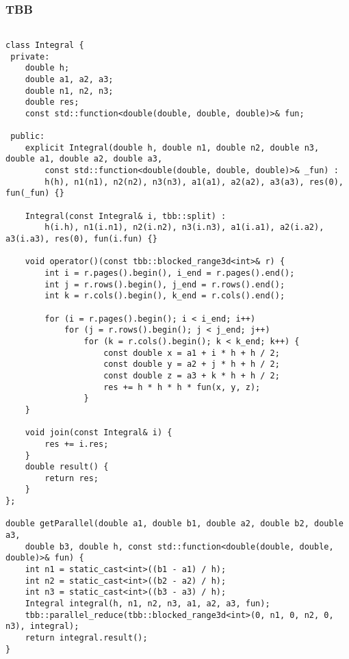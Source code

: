 \documentclass[14pt, a4paper]{extarticle}
\begin{document}
    \subsubsection{TBB}
  \begin{lstlisting}

class Integral {
 private:
    double h;
    double a1, a2, a3;
    double n1, n2, n3;
    double res;
    const std::function<double(double, double, double)>& fun;

 public:
    explicit Integral(double h, double n1, double n2, double n3, double a1, double a2, double a3,
        const std::function<double(double, double, double)>& _fun) :
        h(h), n1(n1), n2(n2), n3(n3), a1(a1), a2(a2), a3(a3), res(0), fun(_fun) {}

    Integral(const Integral& i, tbb::split) :
        h(i.h), n1(i.n1), n2(i.n2), n3(i.n3), a1(i.a1), a2(i.a2), a3(i.a3), res(0), fun(i.fun) {}

    void operator()(const tbb::blocked_range3d<int>& r) {
        int i = r.pages().begin(), i_end = r.pages().end();
        int j = r.rows().begin(), j_end = r.rows().end();
        int k = r.cols().begin(), k_end = r.cols().end();

        for (i = r.pages().begin(); i < i_end; i++)
            for (j = r.rows().begin(); j < j_end; j++)
                for (k = r.cols().begin(); k < k_end; k++) {
                    const double x = a1 + i * h + h / 2;
                    const double y = a2 + j * h + h / 2;
                    const double z = a3 + k * h + h / 2;
                    res += h * h * h * fun(x, y, z);
                }
    }

    void join(const Integral& i) {
        res += i.res;
    }
    double result() {
        return res;
    }
};

double getParallel(double a1, double b1, double a2, double b2, double a3,
    double b3, double h, const std::function<double(double, double, double)>& fun) {
    int n1 = static_cast<int>((b1 - a1) / h);
    int n2 = static_cast<int>((b2 - a2) / h);
    int n3 = static_cast<int>((b3 - a3) / h);
    Integral integral(h, n1, n2, n3, a1, a2, a3, fun);
    tbb::parallel_reduce(tbb::blocked_range3d<int>(0, n1, 0, n2, 0, n3), integral);
    return integral.result();
}

  \end{lstlisting}
  \newpage
\end{document}
